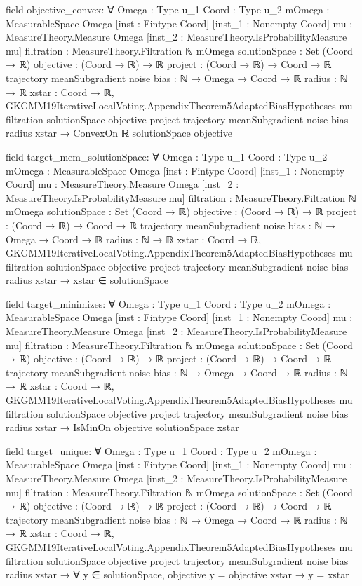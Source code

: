 \documentclass[10pt]{article}
\begin{document}
\begin{ReviewVerbatim}
field objective_convex:
∀ {Omega : Type u_1} {Coord : Type u_2} {mOmega : MeasurableSpace Omega} [inst : Fintype Coord]
  [inst_1 : Nonempty Coord] {mu : MeasureTheory.Measure Omega} [inst_2 : MeasureTheory.IsProbabilityMeasure mu]
  {filtration : MeasureTheory.Filtration ℕ mOmega} {solutionSpace : Set (Coord → ℝ)} {objective : (Coord → ℝ) → ℝ}
  {project : (Coord → ℝ) → Coord → ℝ} {trajectory meanSubgradient noise bias : ℕ → Omega → Coord → ℝ} {radius : ℕ → ℝ}
  {xstar : Coord → ℝ},
  GKGMM19IterativeLocalVoting.AppendixTheorem5AdaptedBiasHypotheses mu filtration solutionSpace objective project
      trajectory meanSubgradient noise bias radius xstar →
    ConvexOn ℝ solutionSpace objective

field target_mem_solutionSpace:
∀ {Omega : Type u_1} {Coord : Type u_2} {mOmega : MeasurableSpace Omega} [inst : Fintype Coord]
  [inst_1 : Nonempty Coord] {mu : MeasureTheory.Measure Omega} [inst_2 : MeasureTheory.IsProbabilityMeasure mu]
  {filtration : MeasureTheory.Filtration ℕ mOmega} {solutionSpace : Set (Coord → ℝ)} {objective : (Coord → ℝ) → ℝ}
  {project : (Coord → ℝ) → Coord → ℝ} {trajectory meanSubgradient noise bias : ℕ → Omega → Coord → ℝ} {radius : ℕ → ℝ}
  {xstar : Coord → ℝ},
  GKGMM19IterativeLocalVoting.AppendixTheorem5AdaptedBiasHypotheses mu filtration solutionSpace objective project
      trajectory meanSubgradient noise bias radius xstar →
    xstar ∈ solutionSpace

field target_minimizes:
∀ {Omega : Type u_1} {Coord : Type u_2} {mOmega : MeasurableSpace Omega} [inst : Fintype Coord]
  [inst_1 : Nonempty Coord] {mu : MeasureTheory.Measure Omega} [inst_2 : MeasureTheory.IsProbabilityMeasure mu]
  {filtration : MeasureTheory.Filtration ℕ mOmega} {solutionSpace : Set (Coord → ℝ)} {objective : (Coord → ℝ) → ℝ}
  {project : (Coord → ℝ) → Coord → ℝ} {trajectory meanSubgradient noise bias : ℕ → Omega → Coord → ℝ} {radius : ℕ → ℝ}
  {xstar : Coord → ℝ},
  GKGMM19IterativeLocalVoting.AppendixTheorem5AdaptedBiasHypotheses mu filtration solutionSpace objective project
      trajectory meanSubgradient noise bias radius xstar →
    IsMinOn objective solutionSpace xstar

field target_unique:
∀ {Omega : Type u_1} {Coord : Type u_2} {mOmega : MeasurableSpace Omega} [inst : Fintype Coord]
  [inst_1 : Nonempty Coord] {mu : MeasureTheory.Measure Omega} [inst_2 : MeasureTheory.IsProbabilityMeasure mu]
  {filtration : MeasureTheory.Filtration ℕ mOmega} {solutionSpace : Set (Coord → ℝ)} {objective : (Coord → ℝ) → ℝ}
  {project : (Coord → ℝ) → Coord → ℝ} {trajectory meanSubgradient noise bias : ℕ → Omega → Coord → ℝ} {radius : ℕ → ℝ}
  {xstar : Coord → ℝ},
  GKGMM19IterativeLocalVoting.AppendixTheorem5AdaptedBiasHypotheses mu filtration solutionSpace objective project
      trajectory meanSubgradient noise bias radius xstar →
    ∀ y ∈ solutionSpace, objective y = objective xstar → y = xstar


\end{ReviewVerbatim}
\end{document}
